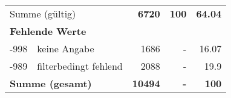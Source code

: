 \begin{longtable}{lXrrr}
     \midrule
     \multicolumn{2}{l}{Summe (gültig)} &
       \textbf{\num{6720}} &
     \textbf{\num{100}} &
       \textbf{\num[round-mode=places,round-precision=2]{64.04}} \\
     \multicolumn{5}{l}{\textbf{Fehlende Werte}}\\
       -998 &
       keine Angabe &
         \num{1686} &
        - &
         \num[round-mode=places,round-precision=2]{16.07} \\
       -989 &
       filterbedingt fehlend &
         \num{2088} &
        - &
         \num[round-mode=places,round-precision=2]{19.9} \\
     \midrule
     \multicolumn{2}{l}{\textbf{Summe (gesamt)}} &
          \textbf{\num{10494}} &
        \textbf{-} &
        \textbf{\num{100}} \\
     \bottomrule
     \end{longtable}
     
